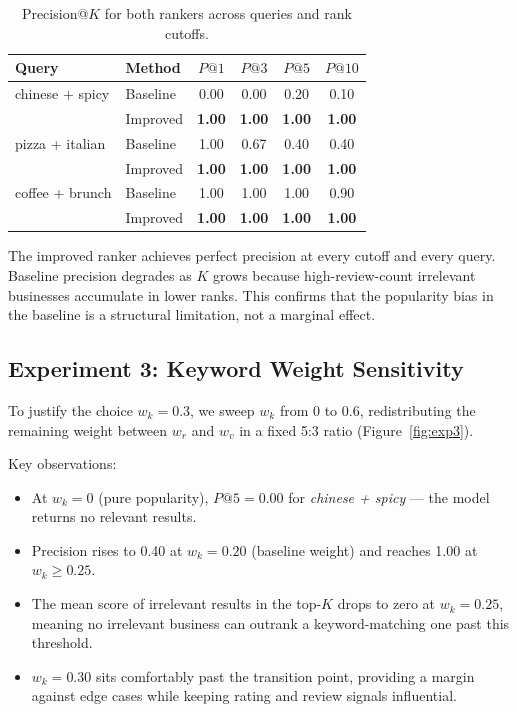 \begin{table}[h]
\centering
\begin{tabular}{llcccc}
\hline
\textbf{Query} & \textbf{Method} & $P@1$ & $P@3$ & $P@5$ & $P@10$ \\
\hline
chinese + spicy & Baseline & 0.00 & 0.00 & 0.20 & 0.10 \\
                & Improved & \textbf{1.00} & \textbf{1.00} & \textbf{1.00} & \textbf{1.00} \\
\hline
pizza + italian & Baseline & 1.00 & 0.67 & 0.40 & 0.40 \\
                & Improved & \textbf{1.00} & \textbf{1.00} & \textbf{1.00} & \textbf{1.00} \\
\hline
coffee + brunch & Baseline & 1.00 & 1.00 & 1.00 & 0.90 \\
                & Improved & \textbf{1.00} & \textbf{1.00} & \textbf{1.00} & \textbf{1.00} \\
\hline
\end{tabular}
\caption{Precision@$K$ for both rankers across queries and rank cutoffs.}
\label{tab:precatk}
\end{table}

The improved ranker achieves perfect precision at every cutoff and
every query.
Baseline precision degrades as $K$ grows because high-review-count
irrelevant businesses accumulate in lower ranks.
This confirms that the popularity bias in the baseline is a
structural limitation, not a marginal effect.

\subsection{Experiment 3: Keyword Weight Sensitivity}

To justify the choice $w_k = 0.3$, we sweep $w_k$ from 0 to 0.6,
redistributing the remaining weight between $w_r$ and $w_v$ in a
fixed 5:3 ratio (Figure~\ref{fig:exp3}).

Key observations:
\begin{itemize}
  \item At $w_k = 0$ (pure popularity), $P@5 = 0.00$ for
        \textit{chinese + spicy} — the model returns no relevant results.
  \item Precision rises to 0.40 at $w_k = 0.20$ (baseline weight)
        and reaches 1.00 at $w_k \geq 0.25$.
  \item The mean score of irrelevant results in the top-$K$ drops to
        zero at $w_k = 0.25$, meaning no irrelevant business can
        outrank a keyword-matching one past this threshold.
  \item $w_k = 0.30$ sits comfortably past the transition point,
        providing a margin against edge cases while keeping
        rating and review signals influential.
\end{itemize}

